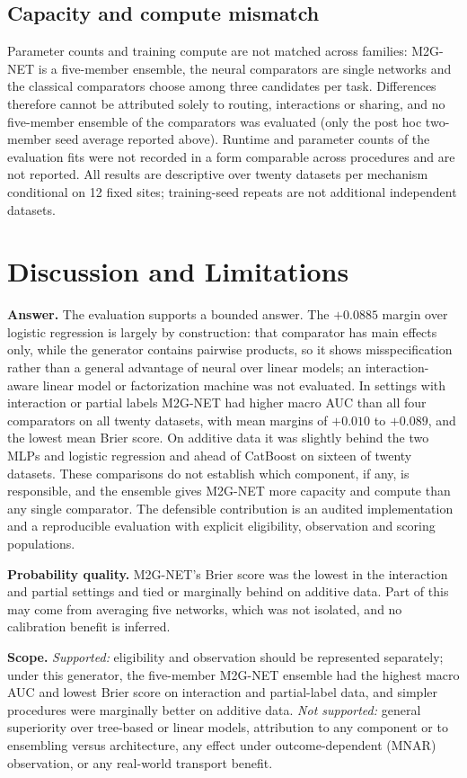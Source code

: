 \documentclass[9pt, conference, a4paper, compsocconf]{IEEEtran}
\begin{document}
\subsection{Capacity and compute mismatch}
Parameter counts and training compute are not matched across families: M2G-NET is a five-member ensemble, the neural comparators are single networks and the classical comparators choose among three candidates per task. Differences therefore cannot be attributed solely to routing, interactions or sharing, and no five-member ensemble of the comparators was evaluated (only the post hoc two-member seed average reported above). Runtime and parameter counts of the evaluation fits were not recorded in a form comparable across procedures and are not reported. All results are descriptive over twenty datasets per mechanism conditional on 12 fixed sites; training-seed repeats are not additional independent datasets.

\section{Discussion and Limitations}
\textbf{Answer.} The evaluation supports a bounded answer. The $+0.0885$ margin over logistic regression is largely by construction: that comparator has main effects only, while the generator contains pairwise products, so it shows misspecification rather than a general advantage of neural over linear models; an interaction-aware linear model or factorization machine \cite{Rendle2010factorization} was not evaluated. In settings with interaction or partial labels M2G-NET had higher macro AUC than all four comparators on all twenty datasets, with mean margins of $+0.010$ to $+0.089$, and the lowest mean Brier score. On additive data it was slightly behind the two MLPs and logistic regression and ahead of CatBoost on sixteen of twenty datasets. These comparisons do not establish which component, if any, is responsible, and the ensemble gives M2G-NET more capacity and compute than any single comparator. The defensible contribution is an audited implementation and a reproducible evaluation with explicit eligibility, observation and scoring populations.

\textbf{Probability quality.} M2G-NET's Brier score was the lowest in the interaction and partial settings and tied or marginally behind on additive data. Part of this may come from averaging five networks, which was not isolated, and no calibration benefit is inferred.

\textbf{Scope.} \emph{Supported:} eligibility and observation should be represented separately; under this generator, the five-member M2G-NET ensemble had the highest macro AUC and lowest Brier score on interaction and partial-label data, and simpler procedures were marginally better on additive data. \emph{Not supported:} general superiority over tree-based or linear models, attribution to any component or to ensembling versus architecture, any effect under outcome-dependent (MNAR) observation, or any real-world transport benefit.
\end{document}
